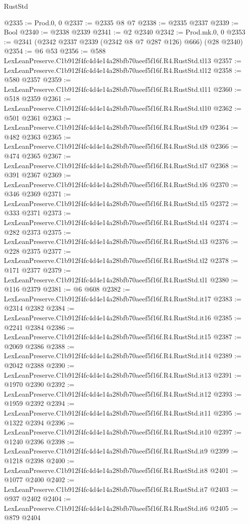 \begin{lexlean}{RustStd}
\begin{coremodule}
@2335 := Prod.{0, 0}
@2337 := @2335 @8 @7
@2338 := @2335 @2337
@2339 := Bool
@2340 := @2338 @2339
@2341 := @2 @2340
@2342 := Prod.mk.{0, 0}
@2353 := @2341 (@2342 @2337 @2339 (@2342 @8 @7 @287 @126) @666) (@28 @2340)
@2354 := @6 @53
@2356 := @588 LexLeanPreserve.C1b912f4fc4d4e14a28bfb70aeef5f16f.R4.RustStd.tl13
@2357 := LexLeanPreserve.C1b912f4fc4d4e14a28bfb70aeef5f16f.R4.RustStd.tl12
@2358 := @580 @2357
@2359 := LexLeanPreserve.C1b912f4fc4d4e14a28bfb70aeef5f16f.R4.RustStd.tl11
@2360 := @518 @2359
@2361 := LexLeanPreserve.C1b912f4fc4d4e14a28bfb70aeef5f16f.R4.RustStd.tl10
@2362 := @501 @2361
@2363 := LexLeanPreserve.C1b912f4fc4d4e14a28bfb70aeef5f16f.R4.RustStd.tl9
@2364 := @482 @2363
@2365 := LexLeanPreserve.C1b912f4fc4d4e14a28bfb70aeef5f16f.R4.RustStd.tl8
@2366 := @474 @2365
@2367 := LexLeanPreserve.C1b912f4fc4d4e14a28bfb70aeef5f16f.R4.RustStd.tl7
@2368 := @391 @2367
@2369 := LexLeanPreserve.C1b912f4fc4d4e14a28bfb70aeef5f16f.R4.RustStd.tl6
@2370 := @346 @2369
@2371 := LexLeanPreserve.C1b912f4fc4d4e14a28bfb70aeef5f16f.R4.RustStd.tl5
@2372 := @333 @2371
@2373 := LexLeanPreserve.C1b912f4fc4d4e14a28bfb70aeef5f16f.R4.RustStd.tl4
@2374 := @282 @2373
@2375 := LexLeanPreserve.C1b912f4fc4d4e14a28bfb70aeef5f16f.R4.RustStd.tl3
@2376 := @228 @2375
@2377 := LexLeanPreserve.C1b912f4fc4d4e14a28bfb70aeef5f16f.R4.RustStd.tl2
@2378 := @171 @2377
@2379 := LexLeanPreserve.C1b912f4fc4d4e14a28bfb70aeef5f16f.R4.RustStd.tl1
@2380 := @116 @2379
@2381 := @6 @608
@2382 := LexLeanPreserve.C1b912f4fc4d4e14a28bfb70aeef5f16f.R4.RustStd.it17
@2383 := @2314 @2382
@2384 := LexLeanPreserve.C1b912f4fc4d4e14a28bfb70aeef5f16f.R4.RustStd.it16
@2385 := @2241 @2384
@2386 := LexLeanPreserve.C1b912f4fc4d4e14a28bfb70aeef5f16f.R4.RustStd.it15
@2387 := @2069 @2386
@2388 := LexLeanPreserve.C1b912f4fc4d4e14a28bfb70aeef5f16f.R4.RustStd.it14
@2389 := @2042 @2388
@2390 := LexLeanPreserve.C1b912f4fc4d4e14a28bfb70aeef5f16f.R4.RustStd.it13
@2391 := @1970 @2390
@2392 := LexLeanPreserve.C1b912f4fc4d4e14a28bfb70aeef5f16f.R4.RustStd.it12
@2393 := @1959 @2392
@2394 := LexLeanPreserve.C1b912f4fc4d4e14a28bfb70aeef5f16f.R4.RustStd.it11
@2395 := @1322 @2394
@2396 := LexLeanPreserve.C1b912f4fc4d4e14a28bfb70aeef5f16f.R4.RustStd.it10
@2397 := @1240 @2396
@2398 := LexLeanPreserve.C1b912f4fc4d4e14a28bfb70aeef5f16f.R4.RustStd.it9
@2399 := @1218 @2398
@2400 := LexLeanPreserve.C1b912f4fc4d4e14a28bfb70aeef5f16f.R4.RustStd.it8
@2401 := @1077 @2400
@2402 := LexLeanPreserve.C1b912f4fc4d4e14a28bfb70aeef5f16f.R4.RustStd.it7
@2403 := @937 @2402
@2404 := LexLeanPreserve.C1b912f4fc4d4e14a28bfb70aeef5f16f.R4.RustStd.it6
@2405 := @879 @2404

\end{coremodule}
\end{lexlean}

